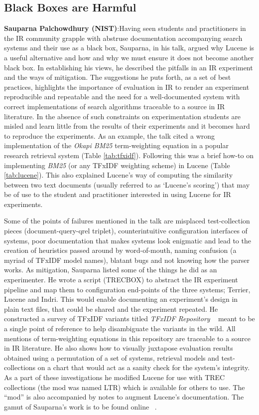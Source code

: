 \subsection*{Black Boxes are Harmful}

{\bf Sauparna Palchowdhury (NIST)}:Having seen students and practitioners in the IR community grapple with abstruse documentation accompanying search systems and their use
as a black box, Sauparna, in his talk, argued why Lucene is a useful
alternative and how and why we must ensure it does not become another
black box. In establishing his views, he described the pitfalls in an
IR experiment and the ways of mitigation. The suggestions he puts
forth, as a set of best practices, highlights the importance of
evaluation in IR to render an experiment reproducible and repeatable
and the need for a well-documented system with correct implementations
of search algorithms traceable to a source in IR literature. In the
absence of such constraints on experimentation students are misled and
learn little from the results of their experiments and it becomes hard
to reproduce the experiments. As an example, the talk cited a wrong
implementation of the \emph{Okapi BM25} term-weighting equation in a
popular research retrieval system (Table \ref{tab:tfxidf}). Following
this was a brief how-to on implementing \emph{BM25} (or any TFxIDF
weighting scheme) in Lucene (Table \ref{tab:lucene}). This also
explained Lucene's way of computing the similarity between two text
documents (usually referred to as `Lucene's scoring') that may be of
use to the student and practitioner interested in using Lucene for IR
experiments.

Some of the points of failures mentioned in the talk are misplaced
test-collection pieces (document-query-qrel triplet), counterintuitive
configuration interfaces of systems, poor documentation that makes
systems look enigmatic and lead to the creation of heuristics passed
around by word-of-mouth, naming confusion (a myriad of TFxIDF model
names), blatant bugs and not knowing how the parser works. As
mitigation, Sauparna listed some of the things he did as an
experimenter. He wrote a script (TRECBOX) to abstract the IR
experiment pipeline and map them to configuration end-points of the
three systems; Terrier, Lucene and Indri. This would enable
documenting an experiment's design in plain text files, that could be
shared and the experiment repeated. He constructed a survey of TFxIDF
variants titled \emph{TFxIDF Repository} ~\cite{rup:TFXIDFRepository}
meant to be a single point of reference to help disambiguate the
variants in the wild. All mentions of term-weighting equations in this
repository are traceable to a source in IR literature. He also shows
how to visually juxtapose evaluation results obtained using a
permutation of a set of systems, retrieval models and test-collections
on a chart that would act as a sanity check for the system's
integrity. As a part of these investigations he modified Lucene for
use with TREC collections (the mod was named LTR) which is available
for others to use. The ``mod'' is also accompanied by notes to augment
Lucene's documentation. The gamut of Sauparna's work is to be found
online ~\cite{rup:IR}.

